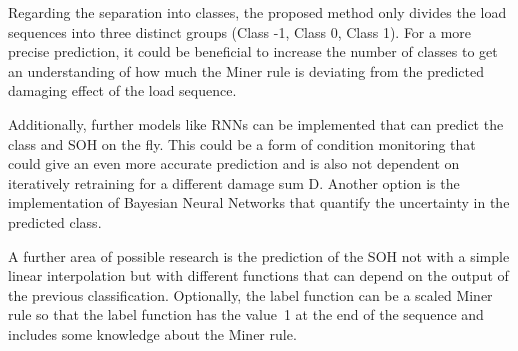 Regarding the separation into classes, the proposed method only divides the load sequences into three distinct groups (Class -1, Class 0, Class 1). For a more precise prediction, it could be beneficial to increase the number of classes to get an understanding of how much the Miner rule is deviating from the predicted damaging effect of the load sequence.

Additionally, further models like RNNs can be implemented that can predict the class and SOH on the fly. This could be a form of condition monitoring that could give an even more accurate prediction and is also not dependent on iteratively retraining for a different damage sum D. Another option is the implementation of Bayesian Neural Networks that quantify the uncertainty in the predicted class. 

A further area of possible research is the prediction of the SOH not with a simple linear interpolation but with different functions that can depend on the output of the previous classification. Optionally, the label function can be a scaled Miner rule so that the label function has the value~1 at the end of the sequence and includes some knowledge about the Miner rule.  